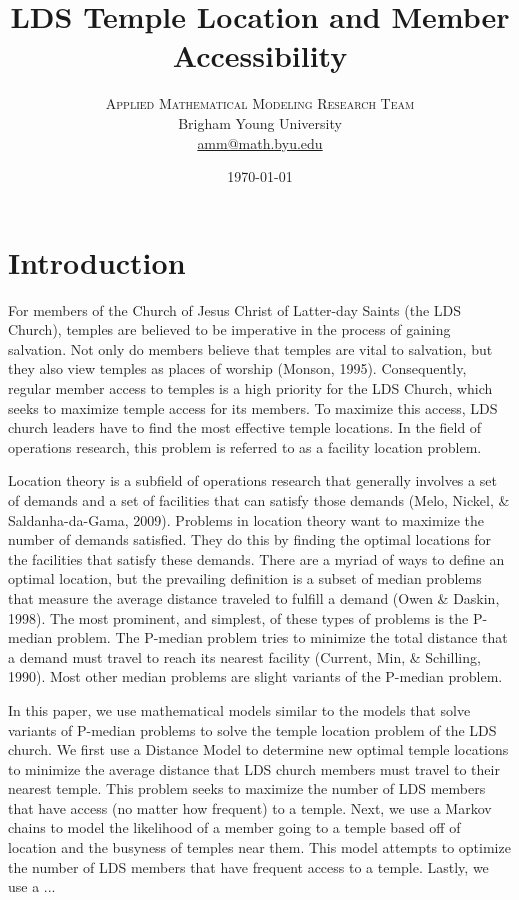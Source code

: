 \documentclass[twoside,twocolumn]{article}
\title{LDS Temple Location and Member Accessibility} %
\author{%
\textsc{Applied Mathematical Modeling Research Team}\\[1ex] %
\normalsize Brigham Young University  \\ %
\normalsize \href{mailto:amm@math.byu.edu}{amm@math.byu.edu} %
}
\date{\today} %
\begin{document}
\maketitle



\section{Introduction}

For members of the Church of Jesus Christ of Latter-day Saints (the LDS Church), temples are believed to be imperative in the process of gaining salvation.
Not only do members believe that temples are vital to salvation, but they also view temples as places of worship (Monson, 1995).
Consequently, regular member access to temples is a high priority for the LDS Church, which seeks to maximize temple access for its members.
To maximize this access, LDS church leaders have to find the most effective temple locations.
In the field of operations research, this problem is referred to as a facility location problem.

Location theory is a subfield of operations research that generally involves a set of demands and a set of facilities that can satisfy those demands (Melo, Nickel, \& Saldanha-da-Gama, 2009).
Problems in location theory want to maximize the number of demands satisfied.
They do this by finding the optimal locations for the facilities that satisfy these demands.
There are a myriad of ways to define an optimal location, but the prevailing definition is a subset of median problems that measure the average distance traveled to fulfill a demand (Owen \& Daskin, 1998). 
The most prominent, and simplest, of these types of problems is the P-median problem.
The P-median problem tries to minimize the total distance that a demand must travel to reach its nearest facility (Current, Min, \& Schilling, 1990).
Most other median problems are slight variants of the P-median problem.

In this paper, we use mathematical models similar to the models that solve variants of P-median problems to solve the temple location problem of the LDS church.
We first use a Distance Model to determine new optimal temple locations to minimize the average distance that LDS church members must travel to their nearest temple.
This problem seeks to maximize the number of LDS members that have access (no matter how frequent) to a temple.
Next, we use a Markov chains to model the likelihood of a member going to a temple based off of location and the busyness of temples near them.
This model attempts to optimize the number of LDS members that have frequent access to a temple.
Lastly, we use a ... %
\end{document}
